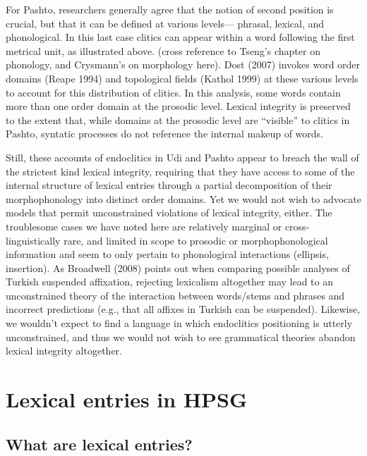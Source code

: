 \documentclass[output=paper]{langsci/langscibook}
\begin{document}
For Pashto, researchers generally agree that the notion of second position is crucial, but that it can be defined at various levels--- phrasal, lexical, and phonological.
In this last case clitics can appear within a word following the first metrical unit, as illustrated above. (cross reference to Tseng's chapter on phonology, and Crysmann's on morphology here).
Dost (2007) invokes word order domains (Reape 1994) and topological fields (Kathol 1999) at these various levels to account for this distribution of clitics.
In this analysis, some words contain more than one order domain at the prosodic level.
Lexical integrity is preserved to the extent that, while domains at the prosodic level are ``visible'' to clitics in Pashto, syntatic processes do not reference the internal makeup of words.

Still, these accounts of endoclitics in Udi and Pashto appear to breach the wall of the strictest kind lexical integrity, requiring that they have access to some of the internal structure of lexical entries through a partial decomposition of their morphophonology into distinct order domains.
Yet we would not wish to advocate models that permit unconstrained violations of lexical integrity, either.
The troublesome cases we have noted here are relatively marginal or cross-linguistically rare, and limited in scope to prosodic or morphophonological information and seem to only pertain to phonological interactions (ellipsis, insertion). As Broadwell (2008) points out when comparing possible analyses of Turkish suspended affixation, rejecting lexicalism altogether may lead to an unconstrained theory of the interaction between words/stems and phrases and incorrect predictions (e.g., that all affixes in Turkish can be suspended). Likewise, we wouldn't expect to find a language in which endoclitics positioning is utterly unconstrained, and thus we would not wish to see grammatical theories abandon lexical integrity altogether.




\section{Lexical entries in HPSG}

\subsection{What are lexical entries?}
\end{document}
